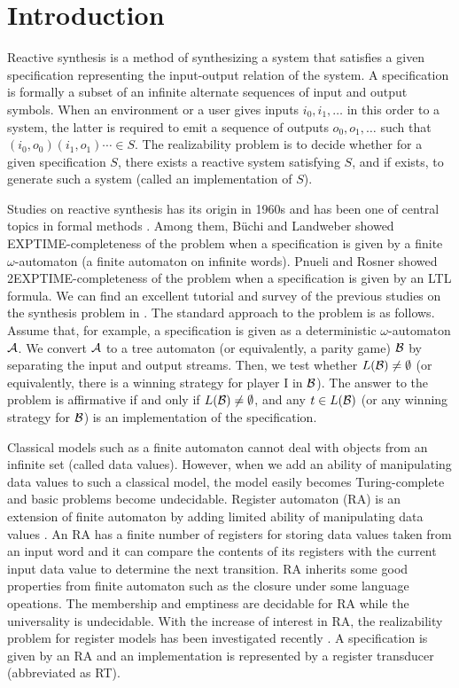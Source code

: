 \section{Introduction}
\noindent
Reactive synthesis is a method of synthesizing a system that satisfies a given specification
representing the input-output relation of the system.
A specification is formally a subset of an infinite alternate sequences of input and output symbols.
When an environment or a user gives inputs $i_0, i_1, \ldots$ in this order
to a system, the latter is required to emit a sequence
of outputs $o_0, o_1, \ldots$ such that $(i_0, o_0)(i_1, o_1)\cdots \in S$.
The realizability problem is to decide whether for a given specification $S$,
there exists a reactive system satisfying $S$, and if exists, to generate such a system
(called an implementation of $S$).

Studies on reactive synthesis has its origin in 1960s and has been one of central topics
in formal methods \cite{CGP01}.
Among them, B\"{u}chi and Landweber \cite{BL69} showed EXPTIME-completeness of the problem
when a specification is given by a finite $\omega$-automaton (a finite automaton on infinite words).
Pnueli and Rosner \cite{PR89} showed 2EXPTIME-completeness of the problem
when a specification is given by an LTL formula.
We can find an excellent tutorial and survey of the previous studies
on the synthesis problem in \cite{BCJ18}.
The standard approach to the problem is as follows.
Assume that, for example, a specification is given as a deterministic $\omega$-automaton ${\cal A}$.
We convert ${\cal A}$ to a tree automaton (or equivalently, a parity game) ${\cal B}$
by separating the input and output streams.
Then, we test whether $L({\cal B})\neq\emptyset$ (or equivalently, there is a winning strategy
for player I in ${\cal B}$).
The answer to the problem is affirmative if and only if $L({\cal B})\not=\emptyset$,
and any $t\in L({\cal B})$ (or any winning strategy for ${\cal B}$)
is an implementation of the specification.

Classical models such as a finite automaton cannot deal with
objects from an infinite set (called data values).
However, when we add an ability of manipulating data values to such a classical model,
the model easily becomes Turing-complete and basic problems become undecidable.
Register automaton (RA) is an extension of finite automaton by adding limited ability of
manipulating data values \cite{Bo02,KF94,NSV04,Se06}.
An RA has a finite number of registers for storing data values taken from an input word and
it can compare the contents of its registers with the current input data value
to determine the next transition.
RA inherits some good properties from finite automaton such as the closure under some
language opeations.
The membership and emptiness are decidable for RA while the universality is undecidable.
With the increase of interest in RA, the realizability problem for register models
has been investigated recently \cite{ESK14,KMB18,EFR19,KK19}.
A specification is given by an RA and
an implementation is represented by a register transducer (abbreviated as RT).

